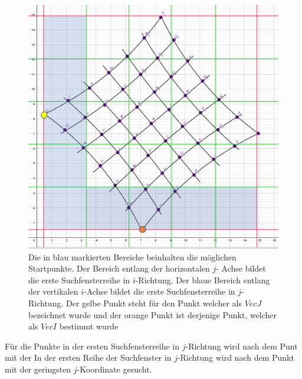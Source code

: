 \begin{figure}[!htb]
	\centering
	\includegraphics[width=0.8\linewidth]{images/VerzeichnetesSchachbrett_1.png}
	\caption[Startpunktsuche in Schachbrettpunkten]{Die in blau markierten Bereiche beinhalten die möglichen Startpunkte. Der Bereich entlang der horizontalen $j$- Achse bildet die erste Suchfensterreihe in $i$-Richtung. Der blaue Bereich entlang der vertikalen $i$-Achse bildet die erste Suchfensterreihe in $j$-Richtung. Der gelbe Punkt steht für den Punkt welcher als $VecJ$ bezeichnet wurde und der orange Punkt ist derjenige Punkt, welcher als $VecI$ bestimmt wurde}
	\label{fig:7.1}
\end{figure}




Für die Punkte in der ersten Suchfensterreihe in $j$-Richtung wird nach dem Punt mit der 
In der ersten Reihe der Suchfenster in $j$-Richtung wird nach dem Punkt mit der geringsten $j$-Koordinate gesucht.



